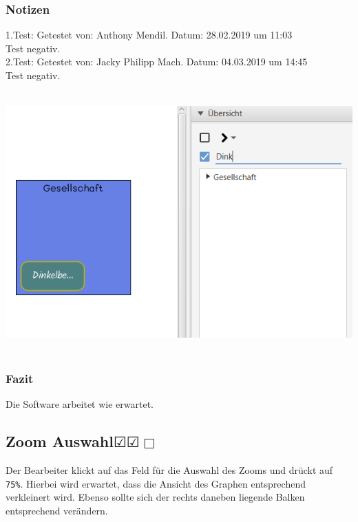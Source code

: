 \documentclass[enabledeprecatedfontcommands]{scrartcl}
\newcommand{\subsectiont}[2]{\subsection[#1]{#1{\normalsize\normalfont #2}}}
\newcommand{\leer}{$\Box$}
\newcommand{\ok}{$\CheckedBox$}
\begin{document}
\subsubsection{Notizen}
1.Test: Getestet von: Anthony Mendil. Datum: 28.02.2019 um 11:03 \\
Test negativ. \\
2.Test: Getestet von: Jacky Philipp Mach. Datum: 04.03.2019 um 14:45 \\
Test negativ.
\begin{center}
\includegraphics[height=10cm]{textsuche.PNG}
\end{center}
\subsubsection{Fazit}
Die Software arbeitet wie erwartet.

\subsectiont{Zoom Auswahl}{\dotfill\ok\ok\leer}
Der Bearbeiter klickt auf das Feld für die Auswahl des Zooms und drückt auf \texttt{75\%}. Hierbei wird erwartet, dass die Ansicht des Graphen entsprechend verkleinert wird. Ebenso sollte sich der rechts daneben liegende Balken entsprechend verändern. 
\end{document}
